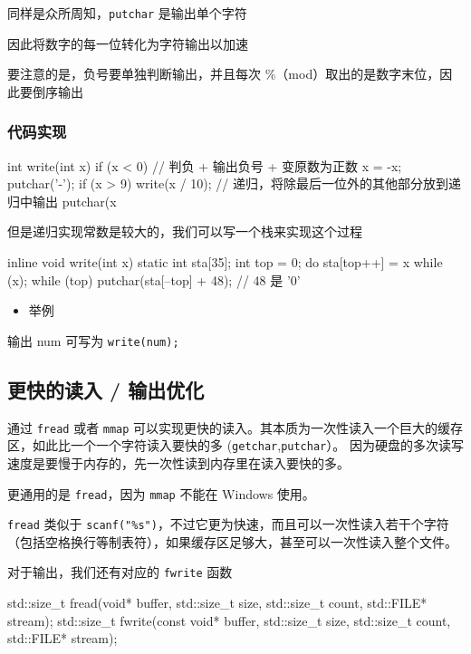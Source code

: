 同样是众所周知，\texttt{putchar} 是输出单个字符

因此将数字的每一位转化为字符输出以加速

要注意的是，负号要单独判断输出，并且每次 \%（mod）取出的是数字末位，因此要倒序输出

\subsubsection{代码实现}

\begin{cppcode}
int write(int x) {
  if (x < 0) {  // 判负 + 输出负号 + 变原数为正数
    x = -x;
    putchar('-');
  }
  if (x > 9) write(x / 10);  // 递归，将除最后一位外的其他部分放到递归中输出
  putchar(x %
}
\end{cppcode}

但是递归实现常数是较大的，我们可以写一个栈来实现这个过程

\begin{cppcode}
inline void write(int x) {
  static int sta[35];
  int top = 0;
  do {
    sta[top++] = x %
  } while (x);
  while (top) putchar(sta[--top] + 48);  // 48 是 '0'
}
\end{cppcode}

\begin{itemize}
\item 举例
\end{itemize}

输出 num 可写为 \texttt{write(num);}

\subsection{更快的读入 / 输出优化}

通过 \texttt{fread} 或者 \texttt{mmap} 可以实现更快的读入。其本质为一次性读入一个巨大的缓存区，如此比一个一个字符读入要快的多 (\texttt{getchar},\texttt{putchar}）。 因为硬盘的多次读写速度是要慢于内存的，先一次性读到内存里在读入要快的多。

更通用的是 \texttt{fread}，因为 \texttt{mmap} 不能在 Windows 使用。

\texttt{fread} 类似于 \texttt{scanf("\%s")}，不过它更为快速，而且可以一次性读入若干个字符（包括空格换行等制表符），如果缓存区足够大，甚至可以一次性读入整个文件。

对于输出，我们还有对应的 \texttt{fwrite} 函数

\begin{cppcode}
std::size_t fread(void* buffer, std::size_t size, std::size_t count,
                  std::FILE* stream);
std::size_t fwrite(const void* buffer, std::size_t size, std::size_t count,
                   std::FILE* stream);
\end{cppcode}

